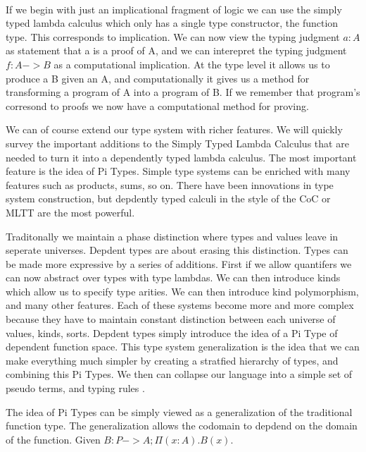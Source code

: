 \documentclass[12pt, titlepage]{article}
\begin{document}
 \\

If we begin with just an implicational fragment of logic we can use the simply typed lambda calculus which only has a
single type constructor, the function type. This corresponds to implication. We can now view the typing judgment $a : A$
as statement that a is a proof of A, and we can interepret the typing judgment $f : A -> B$ as a computational implication.
At the type level it allows us to produce a B given an A, and computationally it gives us a method for transforming a program
of A into a program of B. If we remember that program's corresond to proofs we now have a computational method for proving.

We can of course extend our type system with richer features. We will quickly survey the important additions to the Simply
Typed Lambda Calculus that are needed to turn it into a dependently typed lambda calculus. The most important feature
is the idea of Pi Types. Simple type systems can be enriched with many features such as products, sums, so on. There
have been innovations in type system construction, but depdently typed calculi in the style of the CoC or MLTT are
the most powerful. 

Traditonally we maintain a phase distinction where types and values leave in seperate universes. Depdent types
are about erasing this distinction. Types can be made more expressive by a series of additions. First if we
allow quantifers we can now abstract over types with type lambdas. We can then introduce kinds which allow us
to specify type arities. We can then introduce kind polymorphism, and many other features. Each of these systems become
more and more complex because they have to maintain constant distinction between each universe of values, kinds, sorts.
Depdent types simply introduce the idea of a Pi Type of dependent function space. This type system generalization is the 
idea that we can make everything much simpler by creating a stratfied hierarchy of types, and combining this Pi Types.
We then can collapse our language into a simple set of pseudo terms, and typing rules .

The idea of Pi Types can be simply viewed as a generalization of the traditional function type. The generalization
allows the codomain to depdend on the domain of the function. Given $B : P -> A; \Pi (x : A). B(x)$.
\end{document}
